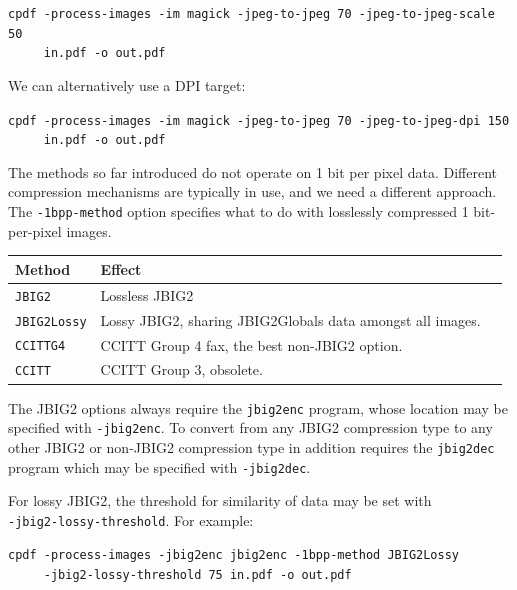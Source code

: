 \documentclass{book}
\begin{document}
  \begin{framed}
  \noindent\small\verb!cpdf -process-images -im magick -jpeg-to-jpeg 70 -jpeg-to-jpeg-scale 50!\\
  \noindent\small\verb!     in.pdf -o out.pdf!
  \end{framed}

\noindent We can alternatively use a DPI target:

  \begin{framed}
  \noindent\small\verb!cpdf -process-images -im magick -jpeg-to-jpeg 70 -jpeg-to-jpeg-dpi 150!\\
  \noindent\small\verb!     in.pdf -o out.pdf!
  \end{framed}

\noindent The methods so far introduced do not operate on 1 bit per pixel data. Different compression mechanisms are typically in use, and we need a different approach. The \texttt{-1bpp-method} option specifies what to do with losslessly compressed 1 bit-per-pixel images.

\bigskip
\begin{tabular}{lp{10cm}l}
Method & Effect\\\hline
{\small\texttt{JBIG2}} & Lossless JBIG2 \\
{\small\texttt{JBIG2Lossy}} & Lossy JBIG2, sharing JBIG2Globals data amongst all images.\\
{\small\texttt{CCITTG4}} & CCITT Group 4 fax, the best non-JBIG2 option.\\
{\small\texttt{CCITT}} & CCITT Group 3, obsolete.
\end{tabular}
\bigskip

\noindent The JBIG2 options always require the \texttt{jbig2enc} program, whose location may be specified with \texttt{-jbig2enc}. To convert from any JBIG2 compression type to any other JBIG2 or non-JBIG2 compression type in addition requires the \texttt{jbig2dec} program which may be specified with \texttt{-jbig2dec}.

For lossy JBIG2, the threshold for similarity of data may be set with\\ \texttt{-jbig2-lossy-threshold}. For example:

  \begin{framed}
  \noindent\small\verb!cpdf -process-images -jbig2enc jbig2enc -1bpp-method JBIG2Lossy!\\
  \noindent\small\verb!     -jbig2-lossy-threshold 75 in.pdf -o out.pdf!
  \end{framed}
\end{document}
